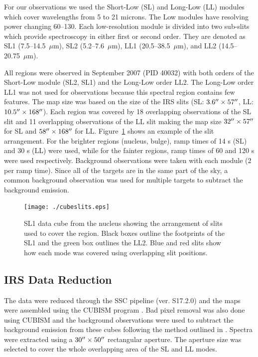 For our observations we used the Short-Low (SL) and Long-Low (LL) modules which cover wavelengths from 5 to 21 microns. 
The Low modules have resolving power changing 60--130. Each low-resolution module is divided into two sub-slits 
which provide spectroscopy in either first or second order. They are denoted as SL1 (7.5--14.5~$\mu$m), SL2 (5.2--7.6~$\mu$m),
LL1 (20.5--38.5~$\mu$m), and LL2 (14.5--20.75~$\mu$m).

All regions were observed in September 2007 (PID 40032) with both orders of the Short-Low module (SL2, SL1) and the Long-Low order LL2. 
The Long-Low order LL1 was not used for observations because this spectral region contains few features. The map size was based on the size 
of the IRS slits (SL: $3.6\hbox{$^{\prime\prime}$} \times 57\hbox{$^{\prime\prime}$}$, LL: $10.5\hbox{$^{\prime\prime}$} \times 168\hbox{$^{\prime\prime}$}$). Each region was covered by 18 overlapping observations 
of the SL slit and 11 overlapping observations of the LL slit making the map size $32\hbox{$^{\prime\prime}$} \times 57\hbox{$^{\prime\prime}$}$ for SL and $58\hbox{$^{\prime\prime}$} \times 168\hbox{$^{\prime\prime}$}$ for LL. 
Figure~\ref{slits} shows an example of the slit arrangement. For the brighter regions (nucleus, bulge), ramp times of 14 s (SL) and 30 s (LL) were used, 
while for the fainter regions, ramp times of 60 and 120 s were used respectively. Background observations were taken with each module (2 per ramp time). 
Since all of the targets are in the same part of the sky, a common background observation was used for multiple targets to subtract the background emission. 

\begin{figure}
\centering
\texttt{[image: ./cubeslits.eps]}
\caption{SL1 data cube from the nucleus showing the arrangement of slits used to cover the region. 
Black boxes outline the footprints of the SL1 and the green box outlines the LL2. Blue and red slits show how 
each mode was covered using overlapping slit positions.
\label{slits}
}
\end{figure}

\subsection{IRS Data Reduction}

The data were reduced through the SSC pipeline (ver. S17.2.0) and the maps were assembled using the CUBISM program \citep{Smith:2007fk}. 
Bad pixel removal was also done using CUBISM and the background observations were used to subtract the background emission from these cubes 
following the method outlined in \citet{Gordon:2008lr}. Spectra were extracted using a $30\hbox{$^{\prime\prime}$}\times50\hbox{$^{\prime\prime}$}$   rectangular aperture. 
The aperture size was selected to cover the whole overlapping area of the SL and LL modes.

